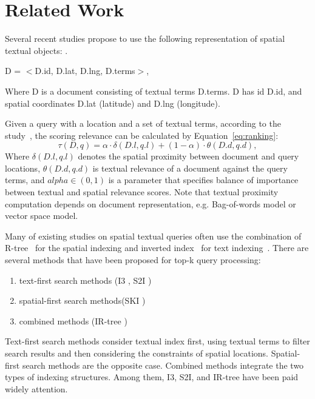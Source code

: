 \documentclass[11pt,a4paper]{article}
\begin{document}
 	\section{Related Work}
 	Several recent studies propose to use the following representation of spatial textual objects: \cite{cao2012spatial,zhang2013scalable,cong2009efficient}. 
 	\begin{description}
 		\centering
 		\item D = $<$D.id, D.lat, D.lng, D.terms$>$,
 	\end{description}
 	Where D is a document consisting of textual terms D.terms.  D has id D.id, and spatial coordinates D.lat (latitude) and D.lng (longitude).
 	
 	Given a query with a location and a set of textual terms, according to the study~\cite{rocha2011efficient}, the scoring relevance can be calculated by Equation~\ref{eq:ranking}:
 	\begin{equation}\label{eq:ranking}
 	\tau(D, q) = \alpha \cdot \delta(D.l, q.l) + (1 - \alpha) \cdot \theta(D.d, q.d),
 	\end{equation}
 	Where $\delta(D.l, q.l)$ denotes the spatial proximity between document and query locations, $\theta(D.d, q.d)$ is textual relevance of a document against the query terms, and $alpha \in (0, 1)$ is a parameter that specifies balance of importance between textual and spatial relevance scores. Note that textual proximity computation depends on document representation, e.g. Bag-of-words model or vector space model.
 	
 	
 	Many of existing studies \cite{cao2012spatial,chen2013spatial,cong2009efficient} on spatial textual queries often use the combination of R-tree~\cite{guttman1984r} for the spatial indexing and inverted index~\cite{zobel2006inverted} for text indexing~\cite{skovsgaard2014top}. There are several methods that have been proposed for top-k query processing: 
 	
 	\begin{enumerate}
 		\item text-first search methods (I3 \cite{zhang2013scalable}, S2I \cite{chen2013spatial})
 		\item spatial-first search methods(SKI \cite{cary2010efficient}) \cite{cong2009efficient}
 		\item combined methods (IR-tree \cite{cong2009efficient})
 	\end{enumerate}
 	
 	Text-first search methods consider textual index first, using textual terms to filter search results and then considering the 
 	constraints of spatial locations. Spatial-first search methods are the opposite case. Combined methods integrate the two types of indexing structures. Among them, I3, S2I, and IR-tree have been paid widely attention. 
 	
\end{document}
